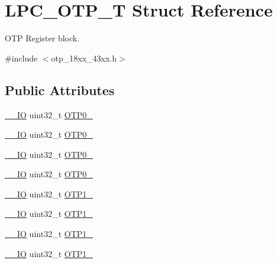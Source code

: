 \hypertarget{struct_l_p_c___o_t_p___t}{}\section{L\+P\+C\+\_\+\+O\+T\+P\+\_\+T Struct Reference}
\label{struct_l_p_c___o_t_p___t}


O\+TP Register block.  




{\ttfamily \#include $<$otp\+\_\+18xx\+\_\+43xx.\+h$>$}

\subsection*{Public Attributes}
\begin{DoxyCompactItemize}
\item 
\hyperlink{core__sc300_8h_aec43007d9998a0a0e01faede4133d6be}{\+\_\+\+\_\+\+IO} uint32\+\_\+t \hyperlink{struct_l_p_c___o_t_p___t_aa229fdc4aff3eaac707ab2bfaccc75d4}{O\+T\+P0\+\_}
\item 
\hyperlink{core__sc300_8h_aec43007d9998a0a0e01faede4133d6be}{\+\_\+\+\_\+\+IO} uint32\+\_\+t \hyperlink{struct_l_p_c___o_t_p___t_a52c39e4d22329afd63902bd189be47f8}{O\+T\+P0\+\_}
\item 
\hyperlink{core__sc300_8h_aec43007d9998a0a0e01faede4133d6be}{\+\_\+\+\_\+\+IO} uint32\+\_\+t \hyperlink{struct_l_p_c___o_t_p___t_a968a5ebe7867b0c136c680de92e6c683}{O\+T\+P0\+\_}
\item 
\hyperlink{core__sc300_8h_aec43007d9998a0a0e01faede4133d6be}{\+\_\+\+\_\+\+IO} uint32\+\_\+t \hyperlink{struct_l_p_c___o_t_p___t_a50ce87e9b59f0ab895c09cd06f2700c6}{O\+T\+P0\+\_}
\item 
\hyperlink{core__sc300_8h_aec43007d9998a0a0e01faede4133d6be}{\+\_\+\+\_\+\+IO} uint32\+\_\+t \hyperlink{struct_l_p_c___o_t_p___t_aec1ad4f51673d758de8de65bddc48009}{O\+T\+P1\+\_}
\item 
\hyperlink{core__sc300_8h_aec43007d9998a0a0e01faede4133d6be}{\+\_\+\+\_\+\+IO} uint32\+\_\+t \hyperlink{struct_l_p_c___o_t_p___t_a46e03ed8af8d5864bcc8d2006bb85742}{O\+T\+P1\+\_}
\item 
\hyperlink{core__sc300_8h_aec43007d9998a0a0e01faede4133d6be}{\+\_\+\+\_\+\+IO} uint32\+\_\+t \hyperlink{struct_l_p_c___o_t_p___t_a467707a6ca10e3399a415b321deae2f1}{O\+T\+P1\+\_}
\item 
\hyperlink{core__sc300_8h_aec43007d9998a0a0e01faede4133d6be}{\+\_\+\+\_\+\+IO} uint32\+\_\+t \hyperlink{struct_l_p_c___o_t_p___t_a32d477cca8a5c23290aa682669fd940e}{O\+T\+P1\+\_}

\end{DoxyCompactItemize}
